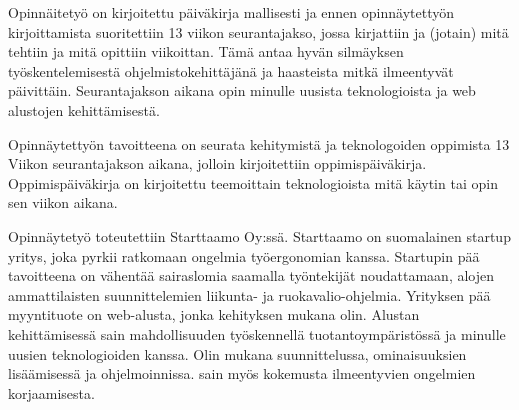\documentclass[11pt,a4paper,titlepage,oneside]{article}
\begin{document}
\medskip


Opinnäitetyö on kirjoitettu päiväkirja mallisesti
ja ennen opinnäytettyön kirjoittamista suoritettiin 13 viikon seurantajakso, jossa
kirjattiin ja (jotain) mitä tehtiin ja mitä opittiin viikoittan.
Tämä antaa hyvän silmäyksen työskentelemisestä ohjelmistokehittäjänä ja haasteista mitkä ilmeentyvät päivittäin.
%
Seurantajakson aikana opin minulle uusista teknologioista ja web alustojen kehittämisestä.

\medskip

Opinnäytettyön tavoitteena on seurata kehitymistä ja teknologoiden oppimista 13 Viikon seurantajakson aikana, jolloin kirjoitettiin oppimispäiväkirja.
Oppimispäiväkirja on kirjoitettu teemoittain teknologioista mitä käytin tai opin sen viikon aikana.


\medskip





Opinnäytetyö toteutettiin Starttaamo Oy:ssä. Starttaamo on suomalainen startup yritys, joka pyrkii ratkomaan ongelmia työergonomian kanssa.
Startupin pää tavoitteena on vähentää sairaslomia saamalla työntekijät noudattamaan, alojen ammattilaisten suunnittelemien liikunta- ja ruokavalio-ohjelmia. 
Yrityksen pää myyntituote on web-alusta, jonka kehityksen mukana olin.
%
Alustan kehittämisessä sain mahdollisuuden työskennellä tuotantoympäristössä ja minulle uusien teknologioiden kanssa.
Olin mukana suunnittelussa, ominaisuuksien lisäämisessä ja ohjelmoinnissa. sain myös kokemusta ilmeentyvien ongelmien korjaamisesta.

\medskip
\end{document}
